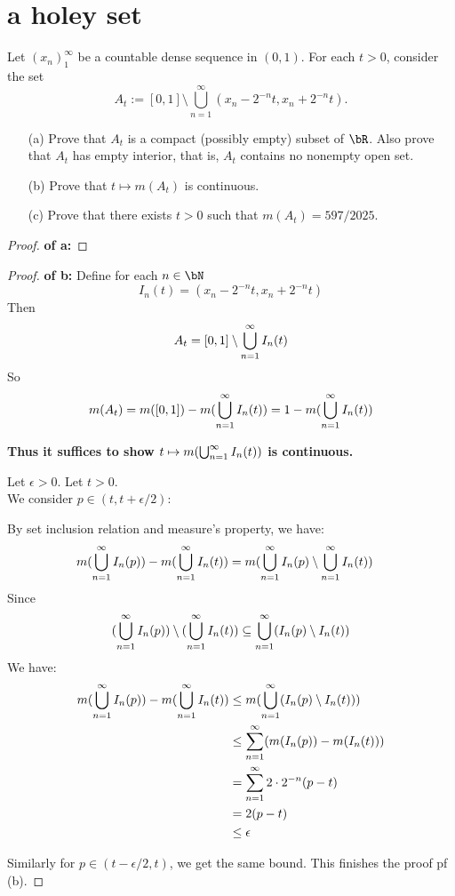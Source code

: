 \documentclass[lang=cn,11pt]{elegantbook}
\begin{document}
\section{a holey set}
  Let $(x_n)_1^\infty$ be a countable dense sequence in $(0,1)$. For each $t>0$, consider the set
  \[
    A_t:=[0,1]\setminus\bigcup_{n=1}^\infty(x_n-2^{-n}t,x_n+2^{-n}t).
  \]
  \begin{itemize}
  \item[(a)]
  Prove that $A_t$ is a compact (possibly empty) subset of $\bR$. Also prove that $A_t$ has empty interior, that is, $A_t$ contains no nonempty open set.
\item[(b)]
  Prove that $t\mapsto m(A_t)$ is continuous.
\item[(c)]
  Prove that there exists $t>0$ such that $m(A_t)=597/2025$.
\end{itemize}
\begin{proof}
   \textbf{ of a:}
\end{proof}
\begin{proof}
   \textbf{ of b:}
Define for each $n\in \bN$
$$
I_n(t) = (x_n - 2^{-n}t, x_n + 2^{-n}t)
$$
Then $$A_t = [0,1] \setminus \bigcup_{n=1}^\infty I_n(t)$$So
$$
m(A_t) = m([0,1]) - m(\bigcup_{n=1}^\infty I_n(t)) = 1 - m(\bigcup_{n=1}^\infty I_n(t))
$$

\textbf{Thus it suffices to show $t \mapsto m(\bigcup_{n=1}^\infty I_n(t))$ is continuous.}

Let $\epsilon >0$.
Let $t >0$.\\
We consider $p \in (t, t+\epsilon/2)$:

By set inclusion relation and measure's property, we have:
\begin{align}
    m(\bigcup_{n=1}^\infty I_n(p)) -    m(\bigcup_{n=1}^\infty I_n(t)) &=  m(\bigcup_{n=1}^\infty I_n(p) \setminus \bigcup_{n=1}^\infty I_n(t))
\end{align}
Since 
$$
(\bigcup_{n=1}^\infty I_n(p)) \setminus (\bigcup_{n=1}^\infty I_n(t)) \subseteq \bigcup_{n=1}^\infty (I_n(p) \setminus I_n(t))
$$
We have:
\begin{align}
      m(\bigcup_{n=1}^\infty I_n(p)) -    m(\bigcup_{n=1}^\infty I_n(t))  &\leq m(\bigcup_{n=1}^\infty (I_n(p) \setminus I_n(t)))\\
      & \leq \sum_{n=1}^\infty (m(I_n(p)) - m(I_n(t)))\\
      &= \sum_{n=1}^\infty 2 \cdot 2^{-n}(p-t) \\
      & = 2(p-t) \\
      & \leq \epsilon
\end{align}

Similarly for $p \in (t-\epsilon/2,t)$, we get the same bound. This finishes the proof pf (b).
\end{proof}
\end{document}

